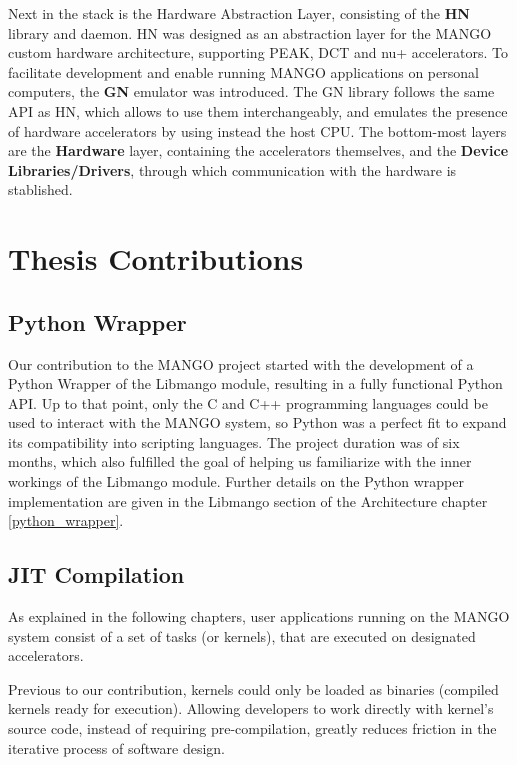 Next in the stack is the Hardware Abstraction Layer, consisting of the \textbf{HN} library and daemon. HN was designed as an abstraction layer for the MANGO custom hardware architecture, supporting PEAK, DCT and nu+ accelerators. To facilitate development and enable running MANGO applications on personal computers, the \textbf{GN} emulator was introduced. The GN library follows the same API as HN, which allows to use them interchangeably, and emulates the presence of hardware accelerators by using instead the host CPU.
The bottom-most layers are the \textbf{Hardware} layer, containing the accelerators themselves, and the \textbf{Device Libraries/Drivers}, through which communication with the hardware is stablished.

\section{Thesis Contributions}
\subsection{Python Wrapper}

Our contribution to the MANGO project started with the development of a Python Wrapper of the Libmango module, resulting in a fully functional Python API. Up to that point, only the C and C++ programming languages could be used to interact with the MANGO system, so Python was a perfect fit to expand its compatibility into scripting languages. The project duration was of six months, which also fulfilled the goal of helping us familiarize with the inner workings of the Libmango module. Further details on the Python wrapper implementation are given in the Libmango section of the Architecture chapter \ref{python_wrapper}.

\subsection{JIT Compilation}

As explained in the following chapters, user applications running on the MANGO system consist of a set of tasks (or kernels), that are executed on designated accelerators. 

Previous to our contribution, kernels could only be loaded as binaries (compiled kernels ready for execution). 
Allowing developers to work directly with kernel's source code, instead of requiring pre-compilation, greatly reduces friction in the iterative process of software design.

